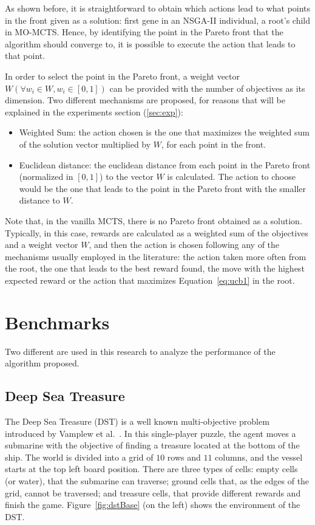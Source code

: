 \documentclass[journal]{IEEEtran}
\begin{document}
As shown before, it is straightforward to obtain which actions lead to what points in the front given as a solution: first gene in an NSGA-II individual, a root's child in MO-MCTS. Hence, by identifying the point in the Pareto front that the algorithm should converge to, 
it is possible to execute the action that leads to that point.

In order to select the point in the Pareto front, a weight vector $W (\forall w_i \in W, w_i \in [0,1])$ can be provided with the number of objectives as its dimension. Two different mechanisms are proposed, for reasons that will be explained in the experiments section (\ref{sec:exp}):

\begin{itemize}
\item Weighted Sum: the action chosen is the one that maximizes the weighted sum of the solution vector multiplied by $W$, for each point in the front.
\item Euclidean distance: the euclidean distance from each point in the Pareto front (normalized in $[0,1]$) to the vector $W$ is calculated. The action to choose would be the one that leads to the point in the Pareto front with the smaller distance to $W$. 
\end{itemize}

Note that, in the vanilla MCTS, there is no Pareto front obtained as a solution. Typically, in this case, rewards are calculated as a weighted sum of the objectives and a weight vector $W$, and then the action is chosen following any of the mechanisms usually employed in the literature: the action taken more often from the root, the one that leads to the best reward found, the move with the highest expected reward or the action that maximizes Equation~\ref{eq:ucb1} in the root.

\section{Benchmarks} \label{sec:bench}

Two different are used in this research to analyze the performance of the algorithm proposed.

\subsection{Deep Sea Treasure} \label{ssec:dst}

The Deep Sea Treasure (DST) is a well known multi-objective problem introduced by Vamplew et al.~\cite{Vamplew2010}. In this single-player puzzle, the agent moves a submarine with the objective of finding a treasure located at the bottom of the ship. The world is divided into a grid of $10$ rows and $11$ columns, and the vessel starts at the top left board position. There are three types of cells: empty cells (or water), that the submarine can traverse; ground cells that, as the edges of the grid, cannot be traversed; and treasure cells, that provide different rewards and finish the game. Figure~\ref{fig:dstBase} (on the left) shows the environment of the DST.
\end{document}
